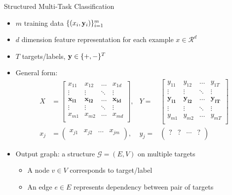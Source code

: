 \documentclass[first=dgreen,second=purple,logo=yellowexc]{aaltoslides}
\newcommand{\yb}{{\bf y}}
\begin{document}
\begin{frame}[allowframebreaks]{Structured Multi-Task Classification}
\begin{itemize}
    \item $m$ training data $\{(x_i,\yb_i)\}_{i=1}^m$
    \item $d$ dimension feature representation for each example $x\in\mathcal{R}^d$
    \item $T$ targets/labels, $\yb\in\{+,-\}^T$
    \item General form:
    \begin{align*}
    X &= \left[ 
    \begin{array}{ccccc} 
    x_{11}&x_{12}&\ldots &x_{1d}\\ 
    \vdots&\vdots&\ddots&\vdots\\ 
    \mathbf{x_{i1}}&\mathbf{x_{i2}}&\ldots &\mathbf{x_{id}}\\ 
    \vdots&\vdots&\ddots&\vdots\\ 
    x_{m1}&x_{m2}&\ldots &x_{md}\\ 
    \end{array} 
    \right],
    &Y =& \left[ 
    \begin{array}{cccc} 
    y_{11}&y_{12}&\ldots &y_{1T}\\ 
    \vdots&\vdots&\ddots&\vdots\\ 
    \mathbf{y_{i1}}&\mathbf{y_{i2}}&\ldots &\mathbf{y_{iT}}\\ 
    \vdots&\vdots&\ddots&\vdots\\ 
    y_{m1}&y_{m2}&\ldots &y_{mT}\\ 
    \end{array} 
    \right]\\
    {x_j} &= \left( 
    \begin{array}{ccccc} 
    {x}_{j1}&{x}_{j2}&\ldots &{x}_{jm}\\
    \end{array} 
    \right),
    &{y_j} =& \left(
    \begin{array}{cccc} 
    ?&?&\cdots&?\\
    \end{array} 
    \right)
    \end{align*}
    \framebreak
    \item Output graph: a structure $\mathcal{G}=(E,V)$ on multiple targets
    \begin{itemize}
        \item A node $v\in V$ corresponds to target/label
        \item An edge $e\in E$ represents dependency between pair of targets  

\end{itemize}
\end{itemize}
\end{frame}
\end{document}
